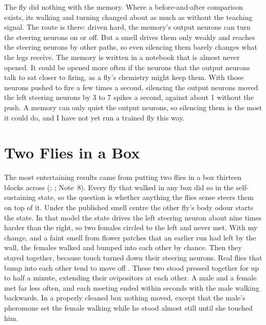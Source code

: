 \documentclass[11pt,a4paper]{article}
\begin{document}
The fly did nothing with the memory. Where a before-and-after comparison exists, its walking and turning changed about as much as without the teaching signal. The route is there: driven hard, the memory's output neurons can turn the steering neurons on or off. But a smell drives them only weakly and reaches the steering neurons by other paths, so even silencing them barely changes what the legs receive. The memory is written in a notebook that is almost never opened. It could be opened more often if the neurons that the output neurons talk to sat closer to firing, as a fly's chemistry might keep them. With those neurons pushed to fire a few times a second, silencing the output neurons moved the left steering neurons by 3 to 7 spikes a second, against about 1 without the push. A memory can only quiet the output neurons, so silencing them is the most it could do, and I have not yet run a trained fly this way.

\section{Two Flies in a Box}
\label{sec:arena}

The most entertaining results came from putting two flies in a box thirteen blocks across (; ; Note~8). Every fly that walked in any box did so in the self-sustaining state, so the question is whether anything the flies sense steers them on top of it. Under the published smell centre the other fly's body odour starts the state. In that model the state drives the left steering neuron about nine times harder than the right, so two females circled to the left and never met. With my change, and a faint smell from flower patches that an earlier run had left by the wall, the females walked and bumped into each other by chance. Then they stayed together, because touch turned down their steering neurons. Real flies that bump into each other tend to move off \citep{ramdya2015mechanosensory}. These two stood pressed together for up to half a minute, extending their ovipositors at each other. A male and a female met far less often, and each meeting ended within seconds with the male walking backwards. In a properly cleaned box nothing moved, except that the male's pheromone set the female walking while he stood almost still until she touched him.
\end{document}
